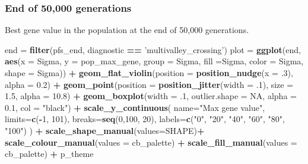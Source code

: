\documentclass[]{book}
\newenvironment{Shaded}{\begin{snugshade}}{\end{snugshade}}
\newcommand{\DataTypeTok}[1]{\textcolor[rgb]{0.13,0.29,0.53}{#1}}
\newcommand{\DecValTok}[1]{\textcolor[rgb]{0.00,0.00,0.81}{#1}}
\newcommand{\FloatTok}[1]{\textcolor[rgb]{0.00,0.00,0.81}{#1}}
\newcommand{\KeywordTok}[1]{\textcolor[rgb]{0.13,0.29,0.53}{\textbf{#1}}}
\newcommand{\NormalTok}[1]{#1}
\newcommand{\OperatorTok}[1]{\textcolor[rgb]{0.81,0.36,0.00}{\textbf{#1}}}
\newcommand{\OtherTok}[1]{\textcolor[rgb]{0.56,0.35,0.01}{#1}}
\newcommand{\StringTok}[1]{\textcolor[rgb]{0.31,0.60,0.02}{#1}}
\begin{document}
\hypertarget{end-of-50000-generations-31}{%
\subsubsection{End of 50,000 generations}\label{end-of-50000-generations-31}}

Best gene value in the population at the end of 50,000 generations.

\begin{Shaded}
\begin{Highlighting}[]
\NormalTok{end =}\StringTok{ }\KeywordTok{filter}\NormalTok{(pfs_end, diagnostic }\OperatorTok{==}\StringTok{ 'multivalley_crossing'}\NormalTok{)}
\NormalTok{plot =}\StringTok{ }\KeywordTok{ggplot}\NormalTok{(end, }\KeywordTok{aes}\NormalTok{(}\DataTypeTok{x =}\NormalTok{ Sigma, }\DataTypeTok{y =}\NormalTok{ pop_max_gene, }\DataTypeTok{group =}\NormalTok{ Sigma, }\DataTypeTok{fill =}\NormalTok{Sigma, }\DataTypeTok{color =}\NormalTok{ Sigma, }\DataTypeTok{shape =}\NormalTok{ Sigma)) }\OperatorTok{+}
\StringTok{  }\KeywordTok{geom_flat_violin}\NormalTok{(}\DataTypeTok{position =} \KeywordTok{position_nudge}\NormalTok{(}\DataTypeTok{x =} \FloatTok{.3}\NormalTok{), }\DataTypeTok{alpha =} \FloatTok{0.2}\NormalTok{) }\OperatorTok{+}
\StringTok{  }\KeywordTok{geom_point}\NormalTok{(}\DataTypeTok{position =} \KeywordTok{position_jitter}\NormalTok{(}\DataTypeTok{width =} \FloatTok{.1}\NormalTok{), }\DataTypeTok{size =} \FloatTok{1.5}\NormalTok{, }\DataTypeTok{alpha =} \FloatTok{10.8}\NormalTok{) }\OperatorTok{+}
\StringTok{  }\KeywordTok{geom_boxplot}\NormalTok{(}\DataTypeTok{width =} \FloatTok{.1}\NormalTok{, }\DataTypeTok{outlier.shape =} \OtherTok{NA}\NormalTok{, }\DataTypeTok{alpha =} \FloatTok{0.1}\NormalTok{, }\DataTypeTok{col =} \StringTok{"black"}\NormalTok{) }\OperatorTok{+}
\StringTok{  }\KeywordTok{scale_y_continuous}\NormalTok{(}
    \DataTypeTok{name=}\StringTok{"Max gene value"}\NormalTok{,}
    \DataTypeTok{limits=}\KeywordTok{c}\NormalTok{(}\OperatorTok{-}\DecValTok{1}\NormalTok{, }\DecValTok{101}\NormalTok{),}
    \DataTypeTok{breaks=}\KeywordTok{seq}\NormalTok{(}\DecValTok{0}\NormalTok{,}\DecValTok{100}\NormalTok{, }\DecValTok{20}\NormalTok{),}
    \DataTypeTok{labels=}\KeywordTok{c}\NormalTok{(}\StringTok{"0"}\NormalTok{, }\StringTok{"20"}\NormalTok{, }\StringTok{"40"}\NormalTok{, }\StringTok{"60"}\NormalTok{, }\StringTok{"80"}\NormalTok{, }\StringTok{"100"}\NormalTok{)}
\NormalTok{  ) }\OperatorTok{+}
\StringTok{  }\KeywordTok{scale_shape_manual}\NormalTok{(}\DataTypeTok{values=}\NormalTok{SHAPE)}\OperatorTok{+}
\StringTok{  }\KeywordTok{scale_colour_manual}\NormalTok{(}\DataTypeTok{values =}\NormalTok{ cb_palette) }\OperatorTok{+}
\StringTok{  }\KeywordTok{scale_fill_manual}\NormalTok{(}\DataTypeTok{values =}\NormalTok{ cb_palette) }\OperatorTok{+}
\StringTok{  }\NormalTok{p_theme}


\end{Highlighting}
\end{Shaded}
\end{document}
